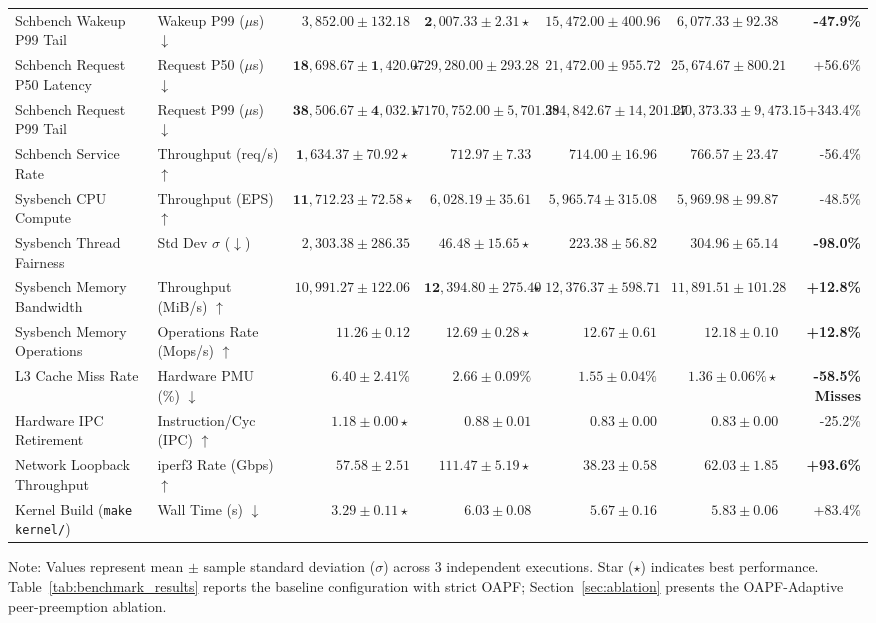 \documentclass[conference]{IEEEtran}
\begin{document}
\begin{table}[t!]
{\begin{tabular}{llrrrrr}
Schbench Wakeup P99 Tail & Wakeup P99 ($\mu$s) $\downarrow$ & $3{,}852.00 \pm 132.18$ & $\mathbf{2{,}007.33 \pm 2.31} \star$ & $15{,}472.00 \pm 400.96$ & $6{,}077.33 \pm 92.38$ & \textbf{-47.9\%} \\
Schbench Request P50 Latency & Request P50 ($\mu$s) $\downarrow$ & $\mathbf{18{,}698.67 \pm 1{,}420.07} \star$ & $29{,}280.00 \pm 293.28$ & $21{,}472.00 \pm 955.72$ & $25{,}674.67 \pm 800.21$ & +56.6\% \\
Schbench Request P99 Tail & Request P99 ($\mu$s) $\downarrow$ & $\mathbf{38{,}506.67 \pm 4{,}032.17} \star$ & $170{,}752.00 \pm 5{,}701.39$ & $284{,}842.67 \pm 14{,}201.27$ & $140{,}373.33 \pm 9{,}473.15$ & +343.4\% \\
Schbench Service Rate & Throughput (req/s) $\uparrow$ & $\mathbf{1{,}634.37 \pm 70.92} \star$ & $712.97 \pm 7.33$ & $714.00 \pm 16.96$ & $766.57 \pm 23.47$ & -56.4\% \\
Sysbench CPU Compute & Throughput (EPS) $\uparrow$ & $\mathbf{11{,}712.23 \pm 72.58} \star$ & $6{,}028.19 \pm 35.61$ & $5{,}965.74 \pm 315.08$ & $5{,}969.98 \pm 99.87$ & -48.5\% \\
Sysbench Thread Fairness & Std Dev $\sigma$ ($\downarrow$) & $2{,}303.38 \pm 286.35$ & $\mathbf{46.48 \pm 15.65} \star$ & $223.38 \pm 56.82$ & $304.96 \pm 65.14$ & \textbf{-98.0\%} \\
Sysbench Memory Bandwidth & Throughput (MiB/s) $\uparrow$ & $10{,}991.27 \pm 122.06$ & $\mathbf{12{,}394.80 \pm 275.40} \star$ & $12{,}376.37 \pm 598.71$ & $11{,}891.51 \pm 101.28$ & \textbf{+12.8\%} \\
Sysbench Memory Operations & Operations Rate (Mops/s) $\uparrow$ & $11.26 \pm 0.12$ & $\mathbf{12.69 \pm 0.28} \star$ & $12.67 \pm 0.61$ & $12.18 \pm 0.10$ & \textbf{+12.8\%} \\
L3 Cache Miss Rate & Hardware PMU (\%) $\downarrow$ & $6.40 \pm 2.41\%$ & $2.66 \pm 0.09\%$ & $1.55 \pm 0.04\%$ & $\mathbf{1.36 \pm 0.06\%} \star$ & \textbf{-58.5\% Misses} \\
Hardware IPC Retirement & Instruction/Cyc (IPC) $\uparrow$ & $\mathbf{1.18 \pm 0.00} \star$ & $0.88 \pm 0.01$ & $0.83 \pm 0.00$ & $0.83 \pm 0.00$ & -25.2\% \\
Network Loopback Throughput & iperf3 Rate (Gbps) $\uparrow$ & $57.58 \pm 2.51$ & $\mathbf{111.47 \pm 5.19} \star$ & $38.23 \pm 0.58$ & $62.03 \pm 1.85$ & \textbf{+93.6\%} \\
Kernel Build (\texttt{make kernel/}) & Wall Time (s) $\downarrow$ & $\mathbf{3.29 \pm 0.11} \star$ & $6.03 \pm 0.08$ & $5.67 \pm 0.16$ & $5.83 \pm 0.06$ & +83.4\% \\
\bottomrule
\end{tabular}%
}
\vspace{0.5ex}
\raggedright \scriptsize Note: Values represent mean $\pm$ sample standard deviation ($\sigma$) across 3 independent executions. Star ($\star$) indicates best performance. Table~\ref{tab:benchmark_results} reports the baseline configuration with strict OAPF; Section~\ref{sec:ablation} presents the OAPF-Adaptive peer-preemption ablation.
\end{table}
\end{document}
